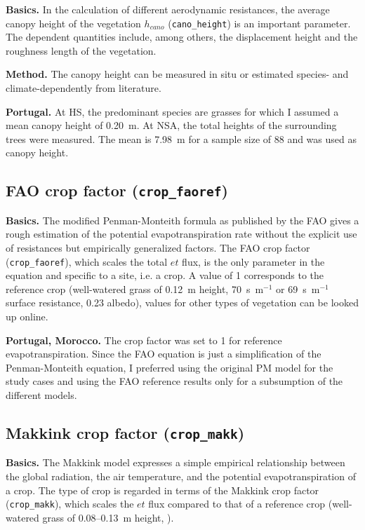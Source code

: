\documentclass{scrreprt}
\begin{document}
\textbf{Basics.}
In the calculation of different aerodynamic resistances, the average canopy height of the vegetation $h_{cano}$ (\verb!cano_height!) is an important parameter.
The dependent quantities include, among others, the displacement height and the roughness length of the vegetation.

\textbf{Method.}
The canopy height can be measured in situ or estimated species- and climate-dependently from literature.

\textbf{Portugal.}
At HS, the predominant species are grasses for which I assumed a mean canopy height of 0.20~m.
At NSA, the total heights of the surrounding trees were measured.
The mean is 7.98~m for a sample size of 88 and was used as canopy height.

\subsection{FAO crop factor (\texttt{crop\_faoref})} \label{ssec:parest_veg_cropfaoref}

\textbf{Basics.}
The modified Penman-Monteith formula as published by the FAO \citep{fao98} gives a rough estimation of the potential evapotranspiration rate without the explicit use of resistances but empirically generalized factors.
The FAO crop factor (\verb!crop_faoref!), which scales the total $et$ flux, is the only parameter in the equation and specific to a site, i.e. a crop.
A value of 1 corresponds to the reference crop (well-watered grass of 0.12~m height, 70~s~m$^{-1}$ \citep{fao98} or 69~s~m$^{-1}$ \citep{shuttleworth07} surface resistance, 0.23 albedo), values for other types of vegetation can be looked up online.

\textbf{Portugal, Morocco.}
The crop factor was set to 1 for reference evapotranspiration.
Since the FAO equation is just a simplification of the Penman-Monteith equation, I preferred using the original PM model for the study cases and using the FAO reference results only for a subsumption of the different models.

\subsection{Makkink crop factor (\texttt{crop\_makk})} \label{ssec:parest_veg_cropmakk}

\textbf{Basics.}
The Makkink model expresses a simple empirical relationship between the global radiation, the air temperature, and the potential evapotranspiration of a crop.
The type of crop is regarded in terms of the Makkink crop factor (\verb!crop_makk!), which scales the $et$ flux compared to that of a reference crop (well-watered grass of 0.08--0.13~m height, \citealt{feddes87}).
\end{document}
